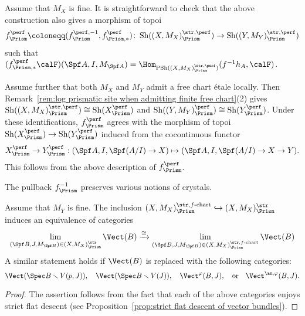 \begin{rem}\label{rem:functoriality of perfect log prismatic site}
Assume that $M_X$ is fine. It is straightforward to check that the above construction also gives a morphism of topoi
\[
f_\Prism^\perf\coloneqq (f^{\perf,-1}_\Prism,f_{\Prism,\ast}^{\perf})\colon \operatorname{Sh}((X,M_X)_\Prism^{\str, \perf})\rightarrow\operatorname{Sh}((Y,M_Y)_\Prism^{\str, \perf})
\]
such that $(f_{\Prism,\ast}^\perf\calF)(\Spf A, I, M_{\Spf A})=\Hom_{\operatorname{PSh}((X,M_X)_\Prism^{\str, \perf})}(f^{-1}h_A,\calF)$.

Assume further that both $M_X$ and $M_Y$ admit a free chart \'etale locally. Then Remark~\ref{rem:log prismatic site when admitting finite free chart}(2) gives $\operatorname{Sh}((X,M_X)_\Prism^{\str, \perf})\cong \operatorname{Sh}(X_\Prism^\perf)$ and $\operatorname{Sh}((Y,M_Y)_\Prism^\perf)\cong \operatorname{Sh}(Y_\Prism^\perf)$. Under these identifications, $f_\Prism^\perf$ agrees with the morphism of topoi $\operatorname{Sh}(X_\Prism^\perf)\rightarrow \operatorname{Sh}(Y_\Prism^\perf)$ induced from the cocontinuous functor
\[
X_\Prism^\perf\rightarrow Y_\Prism^\perf: (\Spf A, I, \Spf (A/I)\rightarrow X) \mapsto (\Spf A, I, \Spf (A/I)\rightarrow X\rightarrow Y).
\]
This follows from the above description of $f_\Prism^\perf$.
\end{rem}


The pullback $f_\Prism^{-1}$ preserves various notions of crystals.

\begin{lem}\label{lem:coherent f-chart ones are cofinal}
    Assume that $M_Y$ is fine. The inclusion $(X,M_X)_\Prism^{\str, f\text{-}\mathrm{chart}}\hookrightarrow(X,M_X)_\Prism^{\str}$ induces an equivalence of categories
    \[
    \lim_{(\Spf B,J,M_{\Spf B})\in (X,M_X)_\Prism^{\str}}\Vect(B)\xrightarrow{\cong}
    \lim_{(\Spf B,J,M_{\Spf B})\in (X,M_X)_\Prism^{\str, f\text{-}\mathrm{chart}}}\Vect(B)
    \]
A similar statement holds if $\Vect(B)$ is replaced with the following categories: 
\[
\Vect(\Spec B\smallsetminus V(p,J)), \quad\Vect(\Spec B\smallsetminus V(J)), \quad\Vect^\varphi(B,J), \quad\text{or}\quad \Vect^{\an,\varphi}(B,J).
\]
\end{lem}

\begin{proof}
The assertion follows from the fact that each of the above categories enjoys strict flat descent (see Proposition~\ref{prop:strict flat descent of vector bundles}).
\end{proof}


